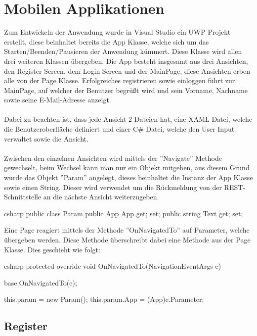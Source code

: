 \section{Mobilen Applikationen}

Zum Entwickeln der Anwendung wurde in Visual Studio ein UWP Projekt erstellt, diese beinhaltet bereits die App Klasse, welche sich um das Starten/Beenden/Pausieren der Anwendung kümmert. Diese Klasse wird allen drei weiteren Klassen übergeben. Die App besteht insgesamt aus drei Ansichten, den Register Screen, dem Login Screen und der MainPage, diese Ansichten erben alle von der Page Klasse. Erfolgreiches registrieren sowie einloggen führt zur MainPage, auf welcher der Benutzer begrüßt wird und sein Vorname, Nachname sowie seine E-Mail-Adresse anzeigt. \cite{uwptutorial}
\\\\
Dabei zu beachten ist, dass jede Ansicht 2 Dateien hat, eine XAML Datei, welche die Benutzeroberfläche definiert und einer C\# Datei, welche den User Input verwaltet sowie die Ansicht.
\\\\
Zwischen den einzelnen Ansichten wird mittels der ''Navigate'' Methode gewechselt, beim Wechsel kann man nur ein Objekt mitgeben, aus diesem Grund wurde das Objekt ''Param'' angelegt, dieses beinhaltet die Instanz der App Klasse sowie einen String. Dieser wird verwendet um die Rückmeldung von der REST-Schnittstelle an die nächste Ansicht weiterzugeben.

\begin{code}{csharp}
	public class Param
	{
		public App App { get; set; }
		public string Text { get; set; }
	}
\end{code}

Eine Page reagiert mittels der Methode ''OnNavigatedTo'' auf Parameter, welche übergeben werden. Diese Methode überschreibt dabei eine Methode aus der Page Klasse. Dies geschieht wie folgt:

\begin{code}{csharp}
protected override void OnNavigatedTo(NavigationEventArgs e)
{
	base.OnNavigatedTo(e);
	
	this.param = new Param();
	this.param.App = (App)e.Parameter;
	
}
\end{code}

\subsection{Register}

